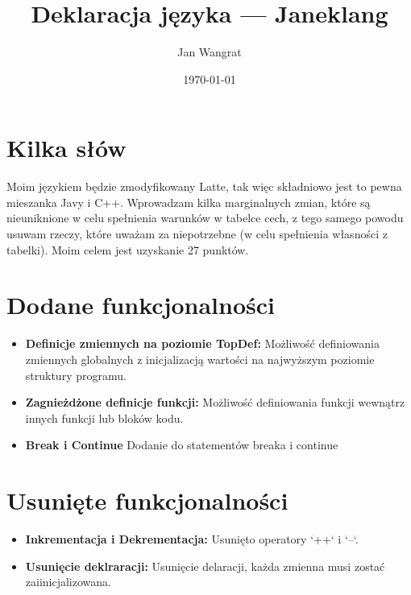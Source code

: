 \documentclass[12pt]{article}
\title{Deklaracja języka --- Janeklang}
\author{Jan Wangrat}
\date{\today}
\begin{document}
\maketitle

\section*{Kilka słów}
Moim językiem będzie zmodyfikowany Latte, tak więc składniowo jest to pewna mieszanka Javy i C++.
Wprowadzam kilka marginalnych zmian, które są nieuniknione w celu spełnienia warunków 
w tabelce cech, z tego samego powodu usuwam rzeczy, które uważam za niepotrzebne (w celu
spełnienia własności z tabelki). Moim celem jest uzyskanie 27 punktów. 

\section*{Dodane funkcjonalności}

\begin{itemize}
    \item \textbf{Definicje zmiennych na poziomie TopDef:} Możliwość definiowania zmiennych globalnych z inicjalizacją wartości na najwyższym poziomie struktury programu.
    \item \textbf{Zagnieżdżone definicje funkcji:} Możliwość definiowania funkcji wewnątrz innych funkcji lub bloków kodu.
    \item \textbf{Break i Continue} Dodanie do statementów breaka i continue
\end{itemize}

\section*{Usunięte funkcjonalności}

\begin{itemize}
  \item \textbf{Inkrementacja i Dekrementacja:} Usunięto operatory `++` i `--`.
  \item \textbf{Usunięcie deklraracji:} Usunięcie delaracji, każda zmienna musi zostać zaiinicjalizowana.
\end{itemize}
\end{document}
